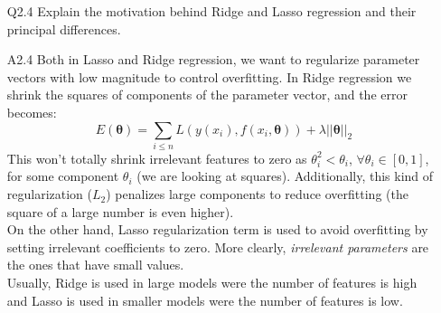 \documentclass[11pt]{scrartcl}
\begin{document}
\begin{itemize}
\item[Q2.4] Explain the motivation behind Ridge and Lasso regression and their principal differences.
\item[A2.4] Both in Lasso and Ridge regression, we want to regularize parameter vectors with low magnitude to control overfitting. In Ridge regression we shrink the squares of components of the parameter vector, and the error becomes:
$$ E(\boldsymbol{\theta}) = \sum_{i \leq n} L(y(x_i), f(x_i, \boldsymbol{\theta})) + \lambda ||\boldsymbol{\theta}||_2$$
This won't totally shrink irrelevant features to zero as $\theta_i^2 < \theta_i$, $\forall \theta_i \in [0,1]$, for some component $\theta_i$ (we are looking at squares). Additionally, this kind of regularization ($L_2$) penalizes large components to reduce overfitting (the square of a large number is even higher).\\
On the other hand, Lasso regularization term is used to avoid overfitting by setting irrelevant coefficients to zero. More clearly, \textit{irrelevant parameters} are the ones that have small values.\\
Usually, Ridge is used in large models were the number of features is high and Lasso is used in smaller models were the number of features is low.
\end{itemize}
\end{document}
